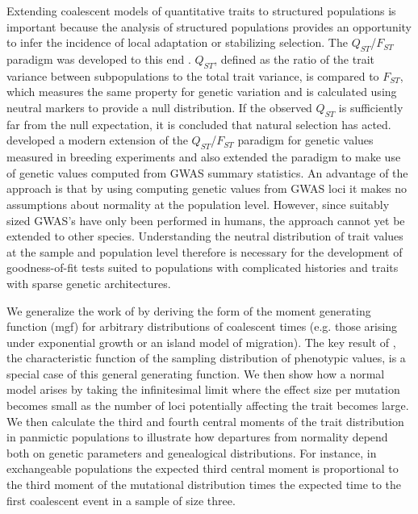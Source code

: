Extending coalescent models of quantitative traits to structured populations is
important because the analysis of structured populations provides an opportunity
to infer the incidence of local adaptation or stabilizing selection. The
$Q_{ST}$/$F_{ST}$ paradigm was developed to this end
\citep{Spitze1993,Whitlock2008,Leinonen2013}. $Q_{ST}$, defined as the ratio of the trait
variance between subpopulations to the total trait variance, is compared to
$F_{ST}$, which measures the same property for genetic variation and is
calculated using neutral markers to provide a null distribution. If the observed
$Q_{ST}$ is sufficiently far from the null expectation, it is concluded that
natural selection has acted. \citet{Ovaskainen2011} developed a modern extension
of the $Q_{ST}$/$F_{ST}$ paradigm for genetic values measured in breeding
experiments and \citet{Berg2014} also extended the paradigm to make use of
genetic values computed from GWAS summary statistics. An advantage of the
\citet{Berg2014} approach is that by using computing genetic values from GWAS
loci it makes no assumptions about normality at the population level. However,
since suitably sized GWAS's have only been performed in humans, the approach
cannot yet be extended to other species. Understanding the neutral distribution
of trait values at the sample and population level therefore is necessary for
the development of goodness-of-fit tests suited to populations with complicated
histories and traits with sparse genetic architectures.

We generalize the work of \citet{Schraiber2015} by deriving the form of the
moment generating function (mgf) for arbitrary distributions of coalescent times
(e.g. those arising under exponential growth or an island model of migration).
The key result of \citet{Schraiber2015}, the characteristic function of the
sampling distribution of phenotypic values, is a special case of this general
generating function. We then show how a normal model arises by taking the
infinitesimal limit where the effect size per mutation becomes small as the
number of loci potentially affecting the trait becomes large. We then calculate
the third and fourth central moments of the trait distribution in panmictic
populations to illustrate how departures from normality depend both on genetic
parameters and genealogical distributions. For instance, in exchangeable
populations the expected third central moment is proportional to the third
moment of the mutational distribution times the expected time to the first
coalescent event in a sample of size three.

